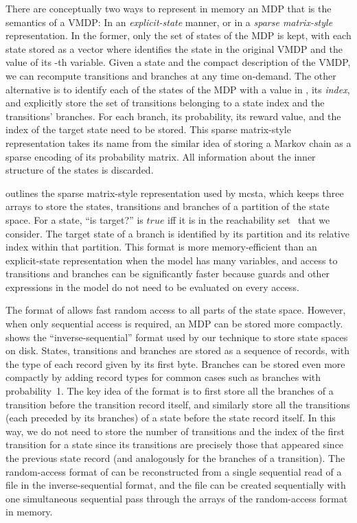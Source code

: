 \documentclass{llncs}
\newcommand{\mcsta}{\textsf{\mbox{mcsta}}\xspace}
\newcommand{\True}[0]{\ensuremath{\mathit{true}}\xspace}
\begin{document}
There are conceptually two ways to represent in memory an MDP that is the semantics of a VMDP:
In an \emph{explicit-state} manner, or in a \emph{sparse matrix-style} representation.
In the former, only the set of states of the MDP is kept, with each state stored as a vector  where  identifies the state in the original VMDP and  the value of its -th variable.
Given a state and the compact description of the VMDP, we can recompute transitions and branches at any time on-demand.
The other alternative is to identify each of the  states of the MDP with a value in , its \emph{index}, and explicitly store the set of transitions belonging to a state index and the transitions' branches.
For each branch, its probability, its reward value, and the index of the target state need to be stored.
This sparse matrix-style representation takes its name from the similar idea of storing a Markov chain as a sparse encoding of its probability matrix.
All information about the inner structure of the states is discarded.

 outlines the sparse matrix-style representation used by \mcsta, which keeps three arrays to store the states, transitions and branches of a partition of the state space.
For a state, ``is target?'' is \True iff it is in the reachability set~ that we consider.
The target state of a branch is identified by its partition and its relative index within that partition.
This format is more memory-efficient than an explicit-state representation when the model has many variables, and access to transitions and branches can be significantly faster because guards and other expressions in the model do not need to be evaluated on every access.

The format of  allows fast random access to all parts of the state space.
However, when only sequential access is required, an MDP can be stored more compactly.
 shows the ``inverse-sequential'' format used by our technique to store state spaces on disk.
States, transitions and branches are stored as a sequence of records, with the type of each record given by its first byte.
Branches can be stored even more compactly by adding record types for common cases such as branches with probability~1.
The key idea of the format is to first store all the branches of a transition before the transition record itself, and similarly store all the transitions (each preceded by its branches) of a state before the state record itself.
In this way, we do not need to store the number of transitions and the index of the first transition for a state since its transitions are precisely those that appeared since the previous state record (and analogously for the branches of a transition).
The random-access format of  can be reconstructed from a single sequential read of a file in the inverse-sequential format, and the file can be created sequentially with one simultaneous sequential pass through the arrays of the random-access format in memory.
\end{document}
